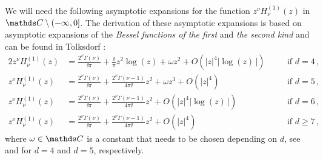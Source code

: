 We will need the following asymptotic expansions for the function $z^\nu H_\nu^{(1)}(z)$ in $\C \setminus (-\infty, 0]$.
The derivation of these asymptotic expansions is based on asymptotic expansions of the \emph{Bessel functions of the first} and \emph{the second kind} and can be found in Tolksdorf \cite[Sec.\@~4.2]{tolksdorf}:
\begin{alignat}{2}
  z^{\nu}H_\nu^{(1)}(z) &= \frac{2^\nu \Gamma(\nu)}{\ii \pi} + \frac{\ii}{\pi} z^2 \log(z) + \omega z^2 + O(|z|^4 \big|\log(z)\,\big|) \quad&&\text{if } d = 4\,, \label{eq:asymptoticd4}\\[0.5em]
  z^{\nu} H_{\nu}^{(1)}(z) &= \frac{2^\nu \Gamma(\nu)}{\ii\pi} + \frac{2^\nu \Gamma(\nu - 1)}{4 \pi \ii} z^2 + \omega z^3 + O(|z|^4) &&\text{if } d = 5\,, \label{eq:asymptoticd5}\\[0.5em]
  z^\nu H_\nu^{(1)}(z) &= \frac{2^\nu \Gamma(\nu)}{\ii \pi} + \frac{2^\nu \Gamma(\nu - 1)}{4\pi \ii}z^2 + O(|z|^4 \big|\log(z)\,\big|) &&\text{if } d = 6\,,\label{eq:asymptoticd6} \\[0.5em]
  z^\nu H_\nu^{(1)}(z) &= \frac{2^\nu \Gamma(\nu)}{\ii \pi} + \frac{2^\nu \Gamma(\nu - 1)}{4 \pi \ii} z^2 + O(|z|^4) &&\text{if } d \geq 7\,,\label{eq:asymptoticd7}
\end{alignat}
where $\omega \in \C$ is a constant that needs to be chosen depending on $d$, see \cite[Eq.\@~(4.19)]{tolksdorf} and \cite[Eq.\@~(4.20)]{tolksdorf} for $d = 4$ and $d = 5$, respectively.


